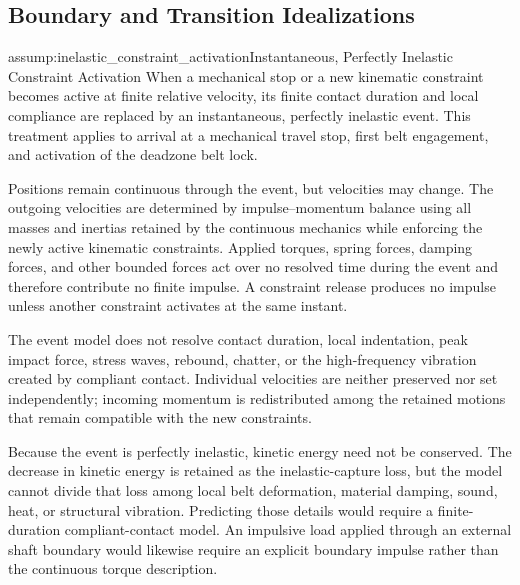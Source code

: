 \documentclass[11pt]{report}
\numberwithin{equation}{section}
\newcounter{assump}
\begin{document}
\subsection{Boundary and Transition Idealizations}

\begin{assumptionblock}{assump:inelastic_constraint_activation}{Instantaneous, Perfectly Inelastic Constraint Activation}
When a mechanical stop or a new kinematic constraint becomes active at finite
relative velocity, its finite contact duration and local compliance are
replaced by an instantaneous, perfectly inelastic event. This treatment
applies to arrival at a mechanical travel stop, first belt engagement, and
activation of the deadzone belt lock.

Positions remain continuous through the event, but velocities may change. The
outgoing velocities are determined by impulse--momentum balance using all
masses and inertias retained by the continuous mechanics while enforcing the
newly active kinematic constraints. Applied torques, spring forces, damping
forces, and other bounded forces act over no resolved time during the event and
therefore contribute no finite impulse. A constraint release produces no
impulse unless another constraint activates at the same instant.

\AssumptionConsequences
The event model does not resolve contact duration, local indentation, peak
impact force, stress waves, rebound, chatter, or the high-frequency vibration
created by compliant contact. Individual velocities are neither preserved nor
set independently; incoming momentum is redistributed among the retained
motions that remain compatible with the new constraints.

Because the event is perfectly inelastic, kinetic energy need not be conserved.
The decrease in kinetic energy is retained as the inelastic-capture loss, but
the model cannot divide that loss among local belt deformation, material
damping, sound, heat, or structural vibration. Predicting those details would
require a finite-duration compliant-contact model. An impulsive load applied
through an external shaft boundary would likewise require an explicit boundary
impulse rather than the continuous torque description.
\end{assumptionblock}
\end{document}
